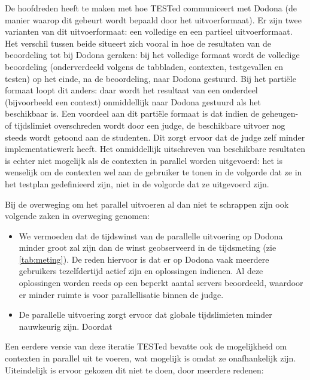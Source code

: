 De hoofdreden heeft te maken met hoe TESTed communiceert met Dodona (de manier waarop dit gebeurt wordt bepaald door het uitvoerformaat).
Er zijn twee varianten van dit uitvoerformaat: een volledige en een partieel uitvoerformaat.
Het verschil tussen beide situeert zich vooral in hoe de resultaten van de beoordeling tot bij Dodona geraken: bij het volledige formaat wordt de volledige beoordeling (onderverdeeld volgens de tabbladen, contexten, testgevallen en testen) op het einde, na de beoordeling, naar Dodona gestuurd.
Bij het partiële formaat loopt dit anders: daar wordt het resultaat van een onderdeel (bijvoorbeeld een context) onmiddellijk naar Dodona gestuurd als het beschikbaar is.
Een voordeel aan dit partiële formaat is dat indien de geheugen- of tijdslimiet overschreden wordt door een judge, de beschikbare uitvoer nog steeds wordt getoond aan de studenten.
Dit zorgt ervoor dat de judge zelf minder implementatiewerk heeft.
Het onmiddellijk uitschreven van beschikbare resultaten is echter niet mogelijk als de contexten in parallel worden uitgevoerd: het is wenselijk om de contexten wel aan de gebruiker te tonen in de volgorde dat ze in het testplan gedefinieerd zijn, niet in de volgorde dat ze uitgevoerd zijn.

Bij de overweging om het parallel uitvoeren al dan niet te schrappen zijn ook volgende zaken in overweging genomen:

\begin{itemize}
    \item We vermoeden dat de tijdswinst van de parallelle uitvoering op Dodona minder groot zal zijn dan de winst geobserveerd in de tijdsmeting (zie \cref{tab:meting}).
    De reden hiervoor is dat er op Dodona vaak meerdere gebruikers tezelfdertijd actief zijn en oplossingen indienen.
    Al deze oplossingen worden reeds op een beperkt aantal servers beoordeeld, waardoor er minder ruimte is voor parallellisatie binnen de judge.
    \item De parallelle uitvoering zorgt ervoor dat globale tijdslimieten minder nauwkeurig zijn.
    Doordat
\end{itemize}


Een eerdere versie van deze iteratie TESTed bevatte ook de mogelijkheid om contexten in parallel uit te voeren, wat mogelijk is omdat ze onafhankelijk zijn.
Uiteindelijk is ervoor gekozen dit niet te doen, door meerdere redenen:

